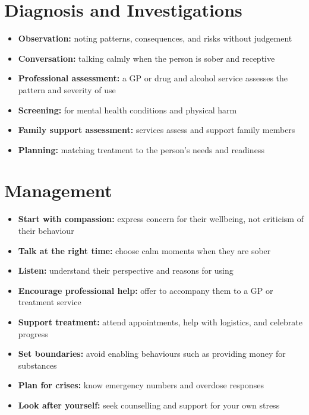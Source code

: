 \section*{Diagnosis and Investigations}
\begin{itemize}
    \item \textbf{Observation:} noting patterns, consequences, and risks without judgement
    \item \textbf{Conversation:} talking calmly when the person is sober and receptive
    \item \textbf{Professional assessment:} a GP or drug and alcohol service assesses the pattern and severity of use
    \item \textbf{Screening:} for mental health conditions and physical harm
    \item \textbf{Family support assessment:} services assess and support family members
    \item \textbf{Planning:} matching treatment to the person's needs and readiness
\end{itemize}

\section*{Management}
\begin{itemize}
    \item \textbf{Start with compassion:} express concern for their wellbeing, not criticism of their behaviour
    \item \textbf{Talk at the right time:} choose calm moments when they are sober
    \item \textbf{Listen:} understand their perspective and reasons for using
    \item \textbf{Encourage professional help:} offer to accompany them to a GP or treatment service
    \item \textbf{Support treatment:} attend appointments, help with logistics, and celebrate progress
    \item \textbf{Set boundaries:} avoid enabling behaviours such as providing money for substances
    \item \textbf{Plan for crises:} know emergency numbers and overdose responses
    \item \textbf{Look after yourself:} seek counselling and support for your own stress
\end{itemize}

